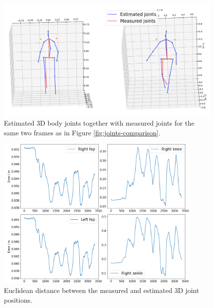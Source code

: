 \documentclass{article}
\begin{document}
\begin{figure}
  \centering
  \includegraphics[width=\textwidth]{figs/joints-3d}
  \caption{Estimated 3D body joints together with measured joints for the same two frames as in Figure \ref{fig:joints-comparison}.}
  \label{fig:joints-comp3d}
\end{figure}

\begin{figure}
    \centering
    \includegraphics[width=0.9\textwidth]{figs/errors-3d}
    \caption{Euclidean distance between the measured and estimated 3D joint positions.}
    \label{fig:errors-3d}
\end{figure}



\newpage


\end{document}
